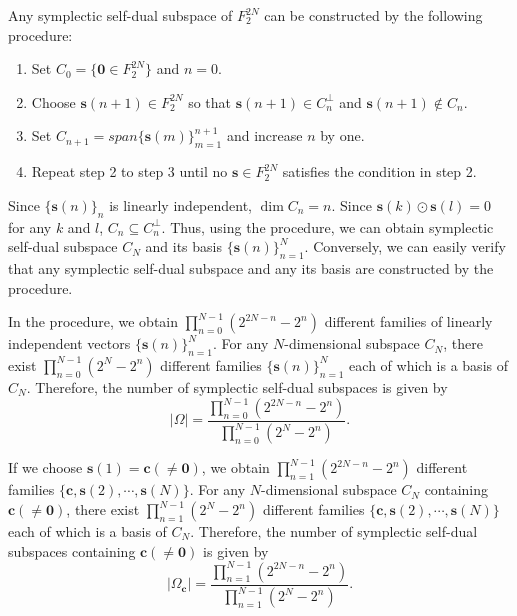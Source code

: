 \documentclass[aps,prx,twocolumn,showpacs,amsmath,notitlepage,amssymb,superscriptaddress]{revtex4-1}
\begin{document}
Any symplectic self-dual subspace of $F_2^{2N}$ can be constructed by the following procedure:
\begin{enumerate}
 \item Set $C_0=\{\mathbf{0}\in F_2^{2N}\}$ and $n=0$.
 \item Choose $\mathbf{s}(n+1)\in F_2^{2N}$ so that $\mathbf{s}(n+1)\in C_{n}^{\bot}$ and $\mathbf{s}(n+1)\notin C_{n}$.
 \item Set $C_{n+1}=span\{\mathbf{s}(m)\}_{m=1}^{n+1}$ and increase $n$ by one.
 \item Repeat step 2 to step 3 until no $\mathbf{s}\in F_2^{2N}$ satisfies the condition in step 2.
\end{enumerate}
Since $\{\mathbf{s}(n)\}_n$ is linearly independent, $\dim C_n=n$. Since $\mathbf{s}(k)\odot\mathbf{s}(l)=0$ for any $k$ and $l$, $C_n\subseteq C_n^{\bot}$. Thus, using the procedure, we can obtain symplectic self-dual subspace $C_N$ and its basis $\{\mathbf{s}(n)\}_{n=1}^N$. Conversely, we can easily verify that any symplectic self-dual subspace and any its basis are constructed by the procedure.

In the procedure, we obtain $\prod_{n=0}^{N-1}(2^{2N-n}-2^{n})$ different families of linearly independent vectors $\{\mathbf{s}(n)\}_{n=1}^N$. For any $N$-dimensional subspace $C_N$, there exist $\prod_{n=0}^{N-1}(2^{N}-2^{n})$ different families $\{\mathbf{s}(n)\}_{n=1}^N$ each of which is a basis of $C_N$. Therefore, the number of symplectic self-dual subspaces is given by
\begin{equation}
 |\Omega|=\frac{\prod_{n=0}^{N-1}(2^{2N-n}-2^{n})}{\prod_{n=0}^{N-1}(2^{N}-2^{n})}.
\end{equation}

If we choose $\mathbf{s}(1)=\mathbf{c}(\neq\mathbf{0})$, we obtain $\prod_{n=1}^{N-1}(2^{2N-n}-2^{n})$ different families $\{\mathbf{c},\mathbf{s}(2),\cdots,\mathbf{s}(N)\}$. For any $N$-dimensional subspace $C_N$ containing $\mathbf{c}(\neq\mathbf{0})$, there exist $\prod_{n=1}^{N-1}(2^{N}-2^{n})$ different families $\{\mathbf{c},\mathbf{s}(2),\cdots,\mathbf{s}(N)\}$ each of which is a basis of $C_N$. Therefore, the number of symplectic self-dual subspaces containing $\mathbf{c}(\neq\mathbf{0})$ is given by
\begin{equation}
 |\Omega_{\mathbf{c}}|=\frac{\prod_{n=1}^{N-1}(2^{2N-n}-2^{n})}{\prod_{n=1}^{N-1}(2^{N}-2^{n})}.
\end{equation}
\end{document}
